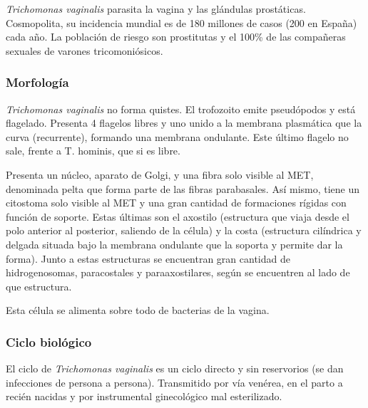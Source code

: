 \textit{Trichomonas vaginalis} parasita la vagina y las glándulas prostáticas. Cosmopolita, su incidencia mundial es de 180 millones de casos (200 en España) cada año. La población de riesgo son prostitutas y el 100\% de las compañeras sexuales de varones tricomoniósicos. 
\subsubsection{Morfología}
\textit{Trichomonas vaginalis} no forma quistes. El trofozoito emite pseudópodos y está flagelado. Presenta 4 flagelos libres y uno unido a la membrana plasmática que la curva (recurrente), formando una membrana ondulante. Este último flagelo no sale, frente a T. hominis, que si es libre.

Presenta un núcleo, aparato de Golgi,  y una fibra solo visible al MET, denominada pelta que forma parte de las fibras parabasales. Así mismo, tiene un citostoma solo visible al MET y una gran cantidad de formaciones rígidas con función de soporte. Estas últimas son el axostilo (estructura que viaja desde el polo anterior al posterior, saliendo de la célula) y la costa (estructura cilíndrica y delgada situada bajo la membrana ondulante que la soporta y permite dar la forma). Junto a estas estructuras se encuentran gran cantidad de hidrogenosomas, paracostales y paraaxostilares, según se encuentren al lado de que estructura.

Esta célula se alimenta sobre todo de bacterias de la vagina.
\subsubsection{Ciclo biológico}
El ciclo de \textit{Trichomonas vaginalis} es un ciclo directo y sin reservorios (se dan infecciones de persona a persona). Transmitido por vía venérea, en el parto a recién nacidas y por instrumental ginecológico mal esterilizado. 

